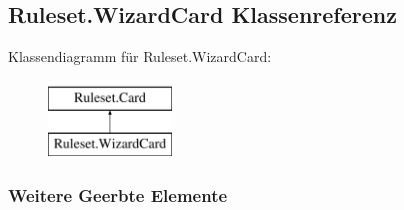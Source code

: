 \hypertarget{a00085}{\subsection{Ruleset.\-Wizard\-Card Klassenreferenz}
\label{a00085}
}
Klassendiagramm für Ruleset.\-Wizard\-Card\-:\begin{figure}[H]
\begin{center}
\leavevmode
\includegraphics[height=2.000000cm]{a00085}
\end{center}
\end{figure}
\subsubsection*{Weitere Geerbte Elemente}
